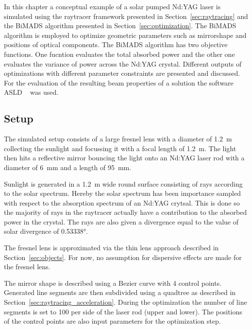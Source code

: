 \documentclass[a4paper,10pt]{article}
\newcommand{\secref}[1]{Section~\ref{#1}}
\begin{document}
    In this chapter a conceptual example of a solar pumped Nd:YAG laser is
    simulated using the raytracer framework presented in \secref{sec:raytracing}
    and the BiMADS algorithm presented in \secref{sec:optimization}.
    The BiMADS algorithm is employed to optimize geometric parameters such
    as mirrorshape and positions of optical components.
    The BiMADS algorithm has two objective functions.
    One fucntion evaluates the total absorbed power and the other one
    evaluates the variance of power across the Nd:YAG crystal.
    Different outputs of optimizations with different parameter constraints
    are presented and discussed.
    For the evaluation of the resulting beam properties of a solution
    the software ASLD ~\cite{asld} was used.

    \subsection{Setup}
    
    The simulated setup consists of a large fresnel lens with a 
    diameter of \SI{1.2}{m}
    collecting the sunlight and focussing it with a focal length of \SI{1.2}{m}.
    The light then hits a reflective mirror bouncing the light onto an Nd:YAG
    laser rod with a diameter of \SI{6}{mm} and a length of \SI{95}{mm}.

    Sunlight is generated in a \SI{1.2}{m} wide round surface consisting of
    rays according to the solar spectrum.
    Hereby the solar spectrum has been importance sampled with
    respect to the absorption spectrum of an Nd:YAG crytsal.
    This is done so the majority of rays in the raytracer actually
    have a contribution to the absorbed power in the crystal.
    The rays are also given a divergence equal to the value of solar divergence
    of \ang{0.53338}.

    The fresnel lens is approximated via the thin lens approach described
    in \secref{sec:objects}.
    For now, no assumption for dispersive effects are made for the
    fresnel lens.

    The mirror shape is described using a Bezier curve with 4 control
    points.
    Generated line segments are then subdivided using a quadtree as described
    in \secref{sec:raytracing_acceleration}.
    During the optimization the number of line segments is set to 100
    per side of the laser rod (upper and lower).
    The positions of the control points are also input parameters
    for the optimization step.
\end{document}
